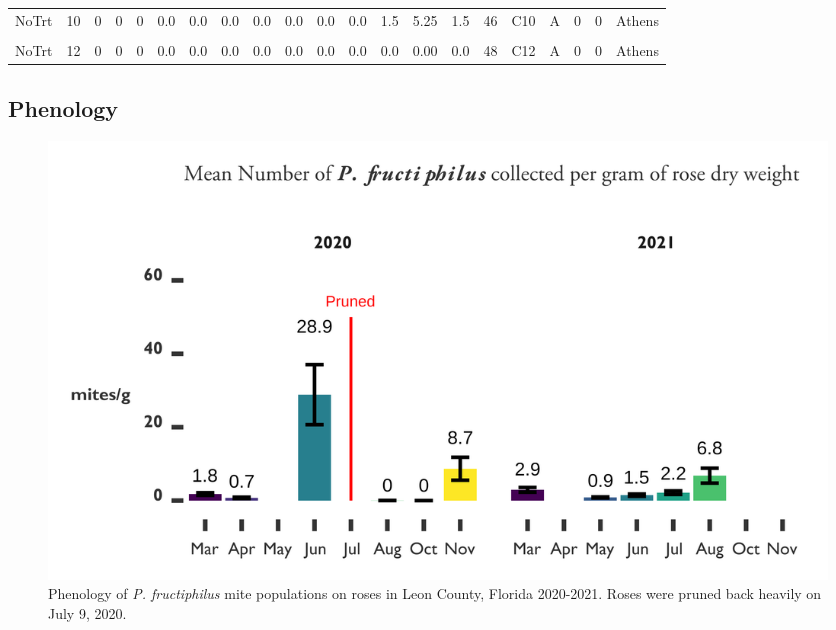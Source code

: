 \documentclass{ufdissertation}[overrideChapters] %
\begin{document}
{\begin{landscape}
\begin{table}
{\begin{tabular}[t]{lrrrrrrrrrrrrrrrllrrl}
\addlinespace
NoTrt & 10 & 0 & 0 & 0 & 0.0 & 0.0 & 0.0 & 0.0 & 0.0 & 0.0 & 0.0 & 1.5 & 5.25 & 1.5 & 46 & C10 & A & 0 & 0 & Athens\\
\cellcolor{gray!6}{NoTrt} & \cellcolor{gray!6}{11} & \cellcolor{gray!6}{0} & \cellcolor{gray!6}{0} & \cellcolor{gray!6}{0} & \cellcolor{gray!6}{0.0} & \cellcolor{gray!6}{0.0} & \cellcolor{gray!6}{0.0} & \cellcolor{gray!6}{0.0} & \cellcolor{gray!6}{0.0} & \cellcolor{gray!6}{0.0} & \cellcolor{gray!6}{0.0} & \cellcolor{gray!6}{0.0} & \cellcolor{gray!6}{0.00} & \cellcolor{gray!6}{0.0} & \cellcolor{gray!6}{47} & \cellcolor{gray!6}{C11} & \cellcolor{gray!6}{A} & \cellcolor{gray!6}{0} & \cellcolor{gray!6}{0} & \cellcolor{gray!6}{Athens}\\
NoTrt & 12 & 0 & 0 & 0 & 0.0 & 0.0 & 0.0 & 0.0 & 0.0 & 0.0 & 0.0 & 0.0 & 0.00 & 0.0 & 48 & C12 & A & 0 & 0 & Athens\\
\bottomrule
\end{tabular}}
\end{table}
\end{landscape}
\hypertarget{phenology}{%
\subsection{Phenology}\label{phenology}}
\begin{figure}[h]

{\centering \includegraphics[width=1\linewidth]{figure/rrv_pheno_bargraph} 

}

\caption[Phenology of \textit{P. fructiphilus} mite populations on roses in Leon County, Florida]{Phenology of \textit{P. fructiphilus} mite populations on roses in Leon County, Florida 2020-2021. Roses were pruned back heavily on July 9, 2020.}\label{fig:pheno-graphs}
\end{figure}
\hypertarget{ipm-trials}{%
}}
\end{document}
